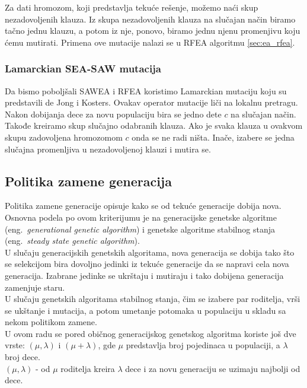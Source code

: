 \documentclass{article}
\begin{document}
Za dati hromozom, koji predstavlja
tekuće rešenje, možemo naći skup nezadovoljenih klauza. 
Iz skupa nezadovoljenih klauza na slučajan način biramo tačno jednu klauzu, 
a potom iz nje, ponovo, biramo jednu njenu promenjivu koju ćemu mutirati. 
Primena ove mutacije nalazi se u RFEA algoritmu \ref{sec:ea_rfea}.

\subsubsection{Lamarckian SEA-SAW mutacija}
\label{sec:ea_lamarckian}
Da bismo poboljšali SAWEA i RFEA koristimo Lamarckian mutaciju koju su predstavili 
de Jong i Kosters. Ovakav operator mutacije liči na lokalnu pretragu. 
Nakon dobijanja dece za novu populaciju bira se jedno dete $c$ na slučajan način.
Takođe kreiramo skup slučajno odabranih klauza. 
Ako je svaka klauza u ovakvom skupu zadovoljena hromozomom $c$ onda se ne radi ništa. 
Inače, izabere se jedna slučajna promenljiva u nezadovoljenoj klauzi i mutira se.


\subsection{Politika zamene generacija}
 \label{sec:ea_zamena}
Politika zamene generacije \cite{vi_Janicic} opisuje kako se od tekuće generacije dobija nova. Osnovna podela po ovom kriterijumu je na generacijske genetske algoritme (eng.~{\em generational genetic algorithm}) i genetske algoritme stabilnog stanja (eng.~{\em steady state genetic algorithm}). \\
 
U slučaju generacijskih genetskih algoritama, nova generacija se dobija tako što se selekcijom bira dovoljno jedinki iz tekuće generacije da se napravi cela nova generacija. Izabrane jedinke se ukrštaju i mutiraju i tako dobijena generacija zamenjuje staru. \\
 
U slučaju genetskih algoritama stabilnog stanja, čim se izabere par roditelja, vrši se ukštanje i mutacija, a potom umetanje potomaka u populaciju u skladu sa nekom politikom zamene. \\
 
U ovom radu se pored običnog generacijskog genetskog algoritma koriste još dve vrste: $(\mu, \lambda) $ i $(\mu + \lambda)$, gde $\mu$ predstavlja broj pojedinaca u populaciji, a $\lambda$ broj dece. \\
 
$(\mu, \lambda)$ - od $\mu$ roditelja kreira $\lambda$ dece i za novu generaciju se uzimaju  najbolji od dece.\\
 
\end{document}

